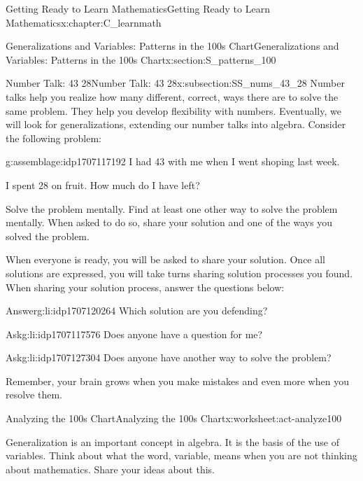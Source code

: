 \documentclass[oneside,10pt,]{book}
\numberwithin{equation}{chapter}
\begin{document}
\begin{chapterptx}{Getting Ready to Learn Mathematics}{}{Getting Ready to Learn Mathematics}{}{}{x:chapter:C_learnmath}
\begin{sectionptx}{Generalizations and Variables: Patterns in the 100s Chart}{}{Generalizations and Variables: Patterns in the 100s Chart}{}{}{x:section:S_patterns_100}
\begin{subsectionptx}{Number Talk: 43 \textminus{} 28}{}{Number Talk: 43 \textminus{} 28}{}{}{x:subsection:SS_nums_43_28}
Number talks help you realize how many different, correct, ways there are to solve the same problem. They help you develop flexibility with numbers. Eventually, we will look for generalizations, extending our number talks into algebra. Consider the following problem:%
\begin{assemblage}{}{g:assemblage:idp1707117192}%
I had \textdollar{}43 with me when I went shoping last week.%
\par
I spent \textdollar{}28 on fruit. How much do I have left?%
\par
Solve the problem mentally. Find at least one other way to solve the problem mentally. When asked to do so, share your solution and one of the ways you solved the problem.%
\end{assemblage}
When everyone is ready, you will be asked to share your solution. Once all solutions are expressed, you will take turns sharing solution processes you found. When sharing your solution process, answer the questions below:%
\begin{descriptionlist}
\begin{dlimedium}{Answer}{g:li:idp1707120264}%
Which solution are you defending?%
\end{dlimedium}%
\begin{dlimedium}{Ask}{g:li:idp1707117576}%
Does anyone have a question for me?%
\end{dlimedium}%
\begin{dlimedium}{Ask}{g:li:idp1707127304}%
Does anyone have another way to solve the problem?%
\end{dlimedium}%
\end{descriptionlist}
Remember, your brain grows when you make mistakes and even more when you resolve them.%
\end{subsectionptx}
%
%
\typeout{************************************************}
\typeout{************************************************}
%
\begin{worksheet-subsection}{Analyzing the 100s Chart}{}{Analyzing the 100s Chart}{}{}{x:worksheet:act-analyze100}
\begin{introduction}{}%
Generalization is an important concept in algebra. It is the basis of the use of variables. Think about what the word, variable, means when you are not thinking about mathematics. Share your ideas about this.%
\par

\end{introduction}
\end{worksheet-subsection}
\end{sectionptx}
\end{chapterptx}
\end{document}
